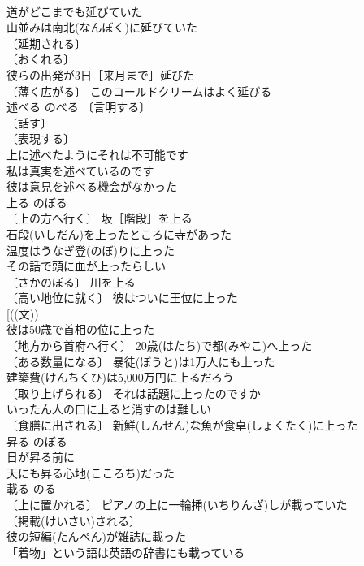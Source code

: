 \documentclass[8pt]{extreport}
\begin{document}
\begin{CJK}{UTF8}{min}
\\	道がどこまでも延びていた 
\\	山並みは南北(なんぼく)に延びていた 
\\	〔延期される〕
\\	〔おくれる〕
\\	彼らの出発が3日［来月まで］延びた 
\\	〔薄く広がる〕 このコールドクリームはよく延びる 
\\	述べる	のべる	〔言明する〕
\\	〔話す〕
\\	〔表現する〕
\\	上に述べたようにそれは不可能です 
\\	私は真実を述べているのです 
\\	彼は意見を述べる機会がなかった 
\\	上る	のぼる	
\\	〔上の方へ行く〕 坂［階段］を上る 
\\	石段(いしだん)を上ったところに寺があった 
\\	温度はうなぎ登(のぼ)りに上った 
\\	その話で頭に血が上ったらしい 
\\	〔さかのぼる〕 川を上る 
\\	〔高い地位に就く〕 彼はついに王位に上った 
\\	[((文))
\\	彼は50歳で首相の位に上った 
\\	〔地方から首府へ行く〕 20歳(はたち)で都(みやこ)へ上った 
\\	〔ある数量になる〕 暴徒(ぼうと)は1万人にも上った 
\\	建築費(けんちくひ)は5,000万円に上るだろう 
\\	〔取り上げられる〕 それは話題に上ったのですか 
\\	いったん人の口に上ると消すのは難しい 
\\	〔食膳に出される〕 新鮮(しんせん)な魚が食卓(しょくたく)に上った 
\\	昇る	のぼる	
\\	日が昇る前に 
\\	天にも昇る心地(こころち)だった 
\\	載る	のる	
\\	〔上に置かれる〕 ピアノの上に一輪挿(いちりんざ)しが載っていた 
\\	〔掲載(けいさい)される〕
\\	彼の短編(たんぺん)が雑誌に載った 
\\	「着物」という語は英語の辞書にも載っている 

\end{CJK}
\end{document}
